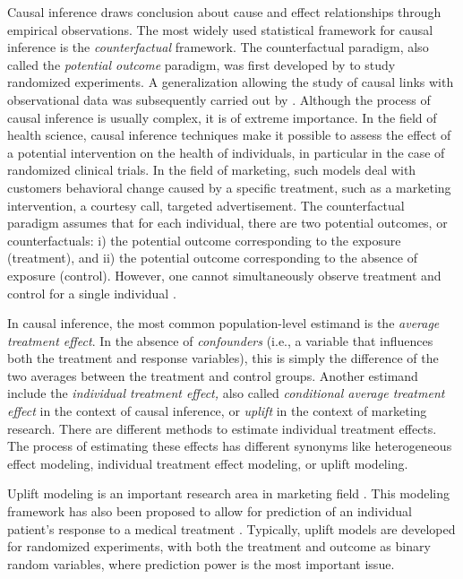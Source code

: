 \documentclass{article}
\begin{document}
Causal inference draws conclusion about cause and effect relationships through empirical observations. The most widely used statistical framework for causal inference is the \emph{counterfactual} framework. The counterfactual paradigm, also called the \emph{potential outcome} paradigm, was first developed by \cite{Neyman:1923} to study randomized experiments. A generalization allowing the study of causal links with observational data was subsequently carried out by \cite{rubin1974estimating}. Although the process of causal inference is usually complex, it is of extreme importance. In the field of health science, causal inference techniques make it possible to assess the effect of a potential intervention on the health of individuals, in particular in the case of randomized clinical trials. In the field of marketing, such models deal with customers behavioral change caused by a specific treatment, such as a marketing intervention, a courtesy call, targeted advertisement. The counterfactual paradigm assumes that for each individual, there are two potential outcomes, or counterfactuals: i) the potential outcome corresponding to the exposure (treatment), and ii) the potential outcome corresponding to the absence of exposure (control). However, one cannot simultaneously observe treatment and control for a single individual \citep{holland1986statistics}.

In causal inference, the most common population-level estimand is the \emph{average treatment effect}. In the absence of \emph{confounders} (i.e., a variable that influences both the treatment and response variables), this is simply the difference of the two averages between the treatment and control groups. Another estimand include the \emph{individual treatment effect,} also called \emph{conditional average treatment effect} in the context of causal inference, or \emph{uplift} in the context of marketing research. There are different  methods to estimate individual treatment effects. The process of estimating these effects has different synonyms like heterogeneous effect modeling, individual treatment effect modeling, or uplift modeling. 

Uplift modeling is an important research area in marketing field \citep{radcliffe1999differential, hansotia2002direct, lo2002true, radcliffe2007using}. 
This modeling framework has also been proposed to allow for prediction of an individual patient’s response to a medical treatment \citep{jaskowski2012uplift,lamont2018identification}.
Typically, uplift models are developed for randomized experiments, with both the treatment and outcome as binary random variables, where prediction power is the most important issue. 
\end{document}

